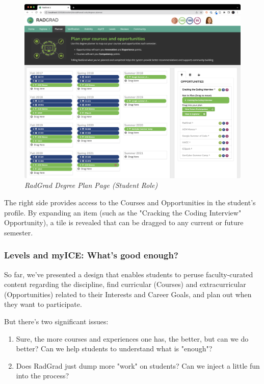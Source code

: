 \documentclass[acmsmall,nonacm]{acmart}
\begin{document}
\begin{figure}[ht]
\centering
\includegraphics[width=\linewidth]{dora-planner.png}
\caption{\em RadGrad Degree Plan Page (Student Role)}
\label{fig:radgrad-student-degree-plan}
\end{figure}

The right side provides access to the Courses and Opportunities in the student's profile. By expanding an item (such as the "Cracking the Coding Interview" Opportunity), a tile is revealed that can be dragged to any current or future semester.

\subsubsection{Levels and myICE: What's good enough?}

So far, we've presented a design that enables students to peruse faculty-curated content regarding the discipline, find curricular (Courses) and extracurricular (Opportunities) related to their Interests and Career Goals, and plan out when they want to participate.

But there's two significant issues:
\begin{enumerate}
\item Sure, the more courses and experiences one has, the better, but can we do better? Can we help students to understand what is "enough"?
\item Does RadGrad just dump more "work" on students? Can we inject a little fun into the process?
\end{enumerate}
\end{document}
